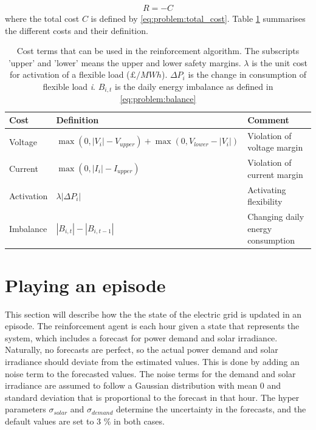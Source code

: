 \documentclass[class=book, crop=false]{standalone}
\begin{document}
\begin{equation}
   \begin{aligned}
   \label{eq:problem:total_reward}
    R = - C
    \end{aligned} 
\end{equation}
where the total cost $C$ is defined by \eqref{eq:problem:total_cost}. Table \ref{table:reward_terms} summarises the different costs and their definition. 

\begin{table}[ht]
\centering
\caption{Cost terms that can be used in the reinforcement algorithm. The subscripts 'upper' and 'lower' means the upper and lower safety margins. $\lambda$ is the unit cost for activation of a flexible load ($\pounds/MWh$). $\Delta P_{i}$ is the change in consumption of flexible load \textit{i}. $B_{i,t}$ is the daily energy imbalance as defined in \eqref{eq:problem:balance}}
\label{table:reward_terms}
\begin{tabular}{l|ll}

Cost  & Definition & Comment
\\ 
\hline
Voltage &
$\max(0,|V_{i}| - V_{upper}) + \max(0,V_{lower}- |V_{i}|)$ &
Violation of voltage margin
\\
Current &
$\max(0,|I_{i}| - I_{upper})$&
Violation of current margin
\\
Activation &
$\lambda |\Delta P_{i}|$&
Activating flexibility
\\
Imbalance &
$|B_{i,t}|- |B_{i,t-1}|$&
Changing daily energy consumption
\\
\hline
\end{tabular}
\end{table}

\section{Playing an episode}
This section will describe how the the state of the electric grid is updated in an episode. The reinforcement agent is each hour given a state that represents the system, which includes a forecast for power demand and solar irradiance. Naturally, no forecasts are perfect, so the actual power demand and solar irradiance should deviate from the estimated values. This is done by adding an noise term to the forecasted values. The noise terms for the demand and solar irradiance are assumed to follow a Gaussian distribution with mean 0 and standard deviation that is proportional to the forecast in that hour. The hyper parameters $\sigma_{solar}$ and $\sigma_{demand}$ determine the uncertainty in the forecasts, and the default values are set to 3 \% in both cases.
\end{document}
